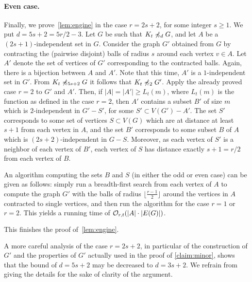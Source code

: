  
 \paragraph{Even case.}
 Finally,
 we prove~\cref{lem:engine} in the case $r=2s+2$, for some integer $s\geq 1$. We put $d=5s+2=5r/2-3$.
Let $G$  be such that 
 $K_t\not\preccurlyeq_{d} G$, and
let $A$ be a $(2s+1)$-independent set in $G$. Consider the graph $G'$ obtained from $G$
by contracting the (pairwise disjoint) balls of radius $s$ around each vertex $v\in A$.
 Let $A'$ denote the set of vertices of $G'$ corresponding to the contracted balls. Again, there is a bijection between $A$ and $A'$. Note that
this time, $A'$ is a $1$-independent set in $G'$.
From $K_t\not\preccurlyeq_{5s+2} G$ it follows that $K_t\not\preccurlyeq_2 G'$. Apply the already proved case $r=2$ to $G'$ and $A'$. 
Then, if $|A|=|A'|\ge L_t(m)$, where $L_t(m)$ is the function as defined in the case $r=2$, then
 $A'$ contains a subset $B'$ of size $m$
which is  $2$-independent in $G'-S'$, for some $S'\subset V(G')-A'$.
The set $S'$ corresponds to some set of vertices $S\subset V(G)$
which are at distance at least $s+1$ from each vertex in $A$,
and the set  $B'$ corresponds to some subset $B$ of $A$
which is $(2s+2)$-independent in $G-S$. Moreover, as each vertex of $S'$
is a neighbor of each vertex of $B'$,  each vertex of $S$
has distance exactly $s+1=r/2$ from each vertex of $B$.

\medskip
An algorithm computing the sets $B$ and $S$ (in either the odd or even case) can be given as follows:
simply run a breadth-first search from each vertex of $A$ to compute the graph $G'$ with the balls of radius  $\lfloor \frac{r-1}2 \rfloor$  around the vertices in $A$ contracted to single vertices, 
and then run the algorithm for the case $r=1$ or $r=2$.
This yields a running time of  $\mathcal{O}_{r,t}(|A|\cdot |E(G)|)$.
 \medskip
  
This finishes  the proof of~\cref{lem:engine}.

\begin{remark}
A more careful analysis of the case $r=2s+2$, in particular of the construction of $G'$ and the properties of $G'$ actually used in the proof of \cref{claim:minor},
shows that the bound of $d=5s+2$ may be decreased to $d=3s+2$. We refrain from giving the details for the sake of clarity of the argument.
\end{remark}

\begin{comment}
\begin{remark}
	It is not difficult to decrease the bound from $d=5s+2$ to $d= 3s+2$
	in the  case when $r=2s+2$. To do so, one would need to formulate~\cref{lem:apex}
	a bit more carefully, and replace the first possibility $K_t\minor_2 G$
	by the following condition, corresponding to the statement of~\cref{claim:minor}:
\begin{quote}
	There are vertices $a_1,b_1,\ldots,a_t,b_t\in A$ 
	such that for each $1\le i\le j\le t$, there is a vertex $z_{ij}\in V(G)-A$
	which is a neighbor of $a_i$ and $b_j$, but not of $b_s$, for $s\neq j$.	
\end{quote}
\end{remark}
\end{comment}


